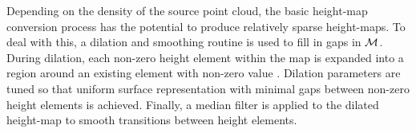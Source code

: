 			Depending on the density of the source point cloud, the basic height-map conversion process has the potential to produce relatively sparse height-maps. To deal with this, a dilation and smoothing routine is used to fill in gaps in ${\cal M}$. During dilation, each non-zero height element within the map is expanded into a region around an existing element with non-zero value \cite{opencv_learn_immorph}. Dilation parameters are tuned so that uniform surface representation with minimal gaps between non-zero height elements is achieved. Finally, a median filter is applied to the dilated height-map to smooth transitions between height elements.
					
